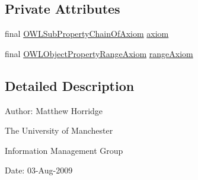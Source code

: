 \subsection*{Private Attributes}
\begin{DoxyCompactItemize}
\item 
final \hyperlink{interfaceorg_1_1semanticweb_1_1owlapi_1_1model_1_1_o_w_l_sub_property_chain_of_axiom}{O\-W\-L\-Sub\-Property\-Chain\-Of\-Axiom} \hyperlink{classorg_1_1semanticweb_1_1owlapi_1_1profiles_1_1_last_property_in_chain_not_in_imposed_range_a111c0b3449dd5868fd68e55ca1378352}{axiom}
\item 
final \hyperlink{interfaceorg_1_1semanticweb_1_1owlapi_1_1model_1_1_o_w_l_object_property_range_axiom}{O\-W\-L\-Object\-Property\-Range\-Axiom} \hyperlink{classorg_1_1semanticweb_1_1owlapi_1_1profiles_1_1_last_property_in_chain_not_in_imposed_range_a950663ea9305a01b3518d6cd85851512}{range\-Axiom}
\end{DoxyCompactItemize}


\subsection{Detailed Description}
Author\-: Matthew Horridge\par
 The University of Manchester\par
 Information Management Group\par
 Date\-: 03-\/\-Aug-\/2009 

